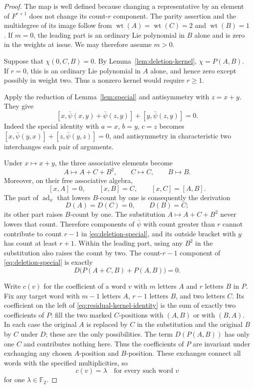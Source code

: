 \documentclass[11pt]{article}
\newcommand{\F}{{\mathbb F_2}}
\DeclareMathOperator{\ad}{ad}
\DeclareMathOperator{\wt}{wt}
\theoremstyle{definition}
\theoremstyle{remark}
\numberwithin{equation}{section}
\begin{document}
\begin{proof}
The map is well defined because changing a representative by an
element of $F^{r+1}$ does not change its count-$r$ component.  The
parity assertion and the multidegree of its image follow from
$\wt(A)=\wt(C)=2$ and $\wt(B)=1$.  If $m=0$, the leading part is an ordinary Lie polynomial
in $B$ alone and is zero in the weights at issue.  We may therefore
assume $m>0$.

Suppose that $\chi(0,C,B)=0$.  By Lemma~\ref{lem:deletion-kernel},
$\chi=P(A,B)$.  If $r=0$, this is an ordinary Lie polynomial in $A$
alone, and hence zero except possibly in weight two.  Thus a nonzero
kernel would require $r\geq1$.

Apply the reduction of Lemma~\ref{lem:special} and antisymmetry with
$z=x+y$.  They give
\begin{equation}\label{eq:deletion-special}
 [x,\bar\psi(x,y)+\bar\psi(z,y)]+[y,\bar\psi(z,y)]=0.
\end{equation}
Indeed the special identity with $a=x$, $b=y$, $c=z$ becomes
$[x,\bar\psi(y,x)]+[z,\bar\psi(y,z)]=0$, and antisymmetry in
characteristic two interchanges each pair of arguments.

Under $x\mapsto x+y$, the three associative elements become
\[
 A\mapsto A+C+B^2,\qquad C\mapsto C,\qquad B\mapsto B.
\]
Moreover, on their free associative algebra,
\[
 [x,A]=0,\qquad [x,B]=C,\qquad [x,C]=[A,B].
\]
The part of $\ad_x$ that lowers $B$-count by one is consequently the
derivation
\[
 D(A)=D(C)=0,\qquad D(B)=C;
\]
its other part raises $B$-count by one.  The substitution
$A\mapsto A+C+B^2$ never lowers that count.  Therefore components of
$\bar\psi$ with count greater than $r$ cannot contribute to count
$r-1$ in \eqref{eq:deletion-special}, and its outside bracket with $y$
has count at least $r+1$.  Within the leading part, using any $B^2$
in the substitution also raises the count by two.  The count-$r-1$
component of \eqref{eq:deletion-special} is exactly
\begin{equation}\label{eq:residual-kernel-identity}
 D\bigl(P(A+C,B)+P(A,B)\bigr)=0.
\end{equation}

Write $c(v)$ for the coefficient of a word $v$ with $m$ letters $A$
and $r$ letters $B$ in $P$.  Fix any target word with $m-1$ letters
$A$, $r-1$ letters $B$, and two letters $C$.  Its coefficient on the
left of \eqref{eq:residual-kernel-identity} is the sum of exactly two
coefficients of $P$: fill the two marked $C$-positions with $(A,B)$
or with $(B,A)$.  In each case the original $A$ is replaced by $C$
in the substitution and the original $B$ by $C$ under $D$; these are
the only possibilities.  The term $D(P(A,B))$ has only one $C$ and
contributes nothing here.  Thus the coefficients of $P$ are invariant
under exchanging any chosen $A$-position and $B$-position.  These
exchanges connect all words with the specified multiplicities, so
\begin{equation}\label{eq:constant-residual-coefficients}
 c(v)=\lambda\quad\text{for every such word }v
\end{equation}
for one $\lambda\in\F$.


\end{proof}
\end{document}
